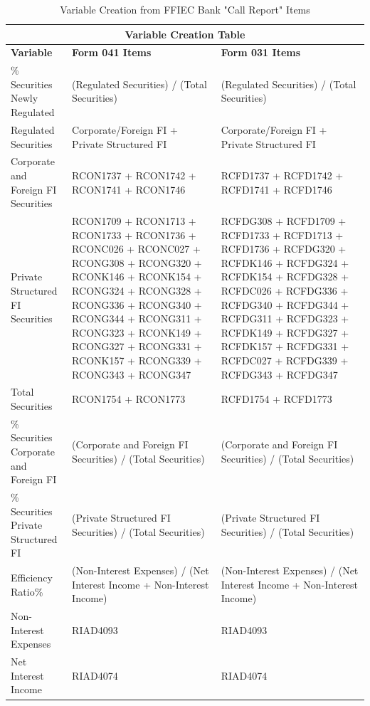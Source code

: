 \documentclass[preprint,12pt]{elsarticle}
\begin{document}
\begin{table}[!htbp] \centering 
  \caption{Variable Creation from FFIEC Bank "Call Report" Items} 
  \label{Table 5} 
  \footnotesize
\begin{tabular} {|m{}|m{}|m{}|}
\hline 
\multicolumn{3}{|c|}{\textbf{Variable Creation Table}} \\
\hline 
 \textbf{Variable} & \textbf{Form 041 Items} & \textbf{Form 031 Items}   \\
 \hline
 
 \%  Securities Newly Regulated & (Regulated Securities) / (Total Securities) & (Regulated Securities) / (Total Securities) \\ 
 \hline
 Regulated Securities & Corporate/Foreign FI + Private Structured FI & Corporate/Foreign FI + Private Structured FI \\
 \hline
 Corporate and Foreign FI Securities & RCON1737 + RCON1742 + RCON1741 + RCON1746 & RCFD1737 + RCFD1742 + RCFD1741 + RCFD1746 \\ 
 \hline
 Private Structured FI Securities & RCON1709 + RCON1713 + RCON1733 + RCON1736 + RCONC026 + RCONC027 + RCONG308 + RCONG320 + RCONK146 + RCONK154 + RCONG324 + RCONG328 + RCONG336 + RCONG340 + RCONG344 + RCONG311 + RCONG323 + RCONK149 + RCONG327 + RCONG331 + RCONK157 + RCONG339 + RCONG343 + RCONG347 & RCFDG308 + RCFD1709 + RCFD1733 + RCFD1713 + RCFD1736 + RCFDG320 + RCFDK146 + RCFDG324 + RCFDK154 + RCFDG328 + RCFDC026 + RCFDG336 + RCFDG340 + RCFDG344 + RCFDG311 + RCFDG323 + RCFDK149 + RCFDG327 + RCFDK157 + RCFDG331 + RCFDC027 + RCFDG339 + RCFDG343 + RCFDG347 \\
 \hline
 Total Securities & RCON1754 + RCON1773 & RCFD1754 + RCFD1773 \\ 
 \hline
 \% Securities Corporate and Foreign FI & (Corporate and Foreign FI Securities) / (Total Securities) & (Corporate and Foreign FI Securities) / (Total Securities) \\ 
 \hline
 \% Securities Private Structured FI & (Private Structured FI Securities) / (Total Securities) & (Private Structured FI Securities) / (Total Securities) \\ 
 \hline
 Efficiency Ratio\% & (Non-Interest Expenses) / (Net Interest Income + Non-Interest Income) & (Non-Interest Expenses) / (Net Interest Income + Non-Interest Income) \\ 
 \hline 
 Non-Interest Expenses & RIAD4093 & RIAD4093 \\ 
 \hline
 Net Interest Income & RIAD4074 & RIAD4074 \\ 

\end{tabular}
\end{table}
\end{document}
